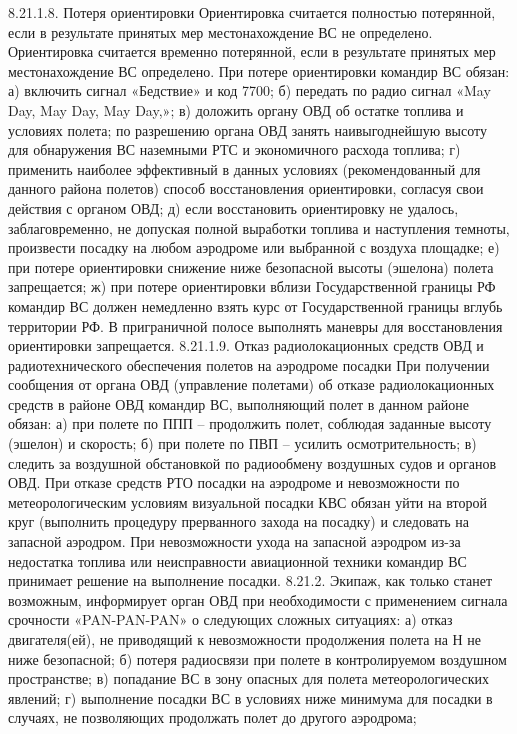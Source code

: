 8.21.1.8.	Потеря ориентировки
Ориентировка считается полностью потерянной, если в результате принятых мер местонахождение ВС не определено.
Ориентировка считается временно потерянной, если в результате принятых мер местонахождение ВС определено.
При потере ориентировки командир ВС обязан:
а)	включить сигнал «Бедствие» и код 7700;
б)	передать по радио сигнал «May Day, May Day, May Day,»;
в)	доложить органу ОВД об остатке топлива и условиях полета; по разрешению органа ОВД занять наивыгоднейшую высоту для обнаружения ВС наземными РТС и экономичного расхода топлива;
г)	применить наиболее эффективный в данных условиях (рекомендованный для данного района полетов) способ восстановления ориентировки, согласуя свои действия с органом ОВД;
д)	если восстановить ориентировку не удалось, заблаговременно, не допуская полной выработки топлива и наступления темноты, произвести посадку на любом аэродроме или выбранной с воздуха площадке;
е)	при потере ориентировки снижение ниже безопасной высоты (эшелона) полета запрещается;
ж)	при потере ориентировки вблизи Государственной границы РФ командир ВС должен немедленно взять курс от Государственной границы вглубь территории РФ.
В приграничной полосе выполнять маневры для восстановления ориентировки запрещается.
8.21.1.9.	Отказ радиолокационных средств ОВД и радиотехнического обеспечения полетов на аэродроме посадки
При получении сообщения от органа ОВД (управление полетами) об отказе радиолокационных средств в районе ОВД командир ВС, выполняющий полет в данном районе обязан:
а)	при полете по ППП – продолжить полет, соблюдая заданные высоту (эшелон) и скорость;
б)	при полете по ПВП – усилить осмотрительность;
в)	следить за воздушной обстановкой по радиообмену воздушных судов и органов ОВД.
При отказе средств РТО посадки на аэродроме и невозможности по метеорологическим условиям визуальной посадки КВС обязан уйти на второй круг (выполнить процедуру прерванного захода на посадку) и следовать на запасной аэродром. При невозможности ухода на запасной аэродром из-за недостатка топлива или неисправности авиационной техники командир ВС принимает решение на выполнение посадки.
8.21.2.	Экипаж, как только станет возможным, информирует орган ОВД при необходимости с применением сигнала срочности «PAN-PAN-PAN» о следующих сложных ситуациях:
а)	отказ двигателя(ей), не приводящий к невозможности продолжения полета на Н не ниже безопасной;
б)	потеря радиосвязи при полете в контролируемом воздушном пространстве;
в)	попадание ВС в зону опасных для полета метеорологических явлений;
г)	выполнение посадки ВС в условиях ниже минимума для посадки в случаях, не позволяющих продолжать полет до другого аэродрома;

